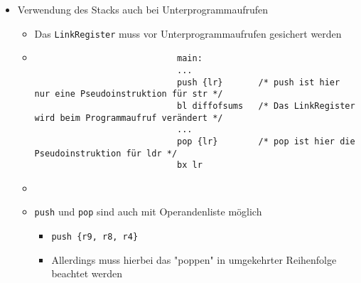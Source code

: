 \begin{itemize}
\begin{itemize}
                \item Verwendung des Stacks auch bei Unterprogrammaufrufen
                    \begin{itemize}
                        \item Das \texttt{LinkRegister} muss vor Unterprogrammaufrufen gesichert werden
                        \item[]
                            \begin{verbatim}
                            main:
                            ...
                            push {lr}       /* push ist hier nur eine Pseudoinstruktion für str */
                            bl diffofsums   /* Das LinkRegister wird beim Programmaufruf verändert */
                            ...
                            pop {lr}        /* pop ist hier die Pseudoinstruktion für ldr */
                            bx lr       
                            \end{verbatim}
                        \item[]
                        \item \texttt{push} und \texttt{pop} sind auch mit Operandenliste möglich
                            \begin{itemize}
                                \item \texttt{push \{r9, r8, r4\}}
                                \item Allerdings muss hierbei das \string"poppen\string" in umgekehrter Reihenfolge beachtet werden
                            \end{itemize}
                    \end{itemize}
            \end{itemize}
    \end{itemize}

